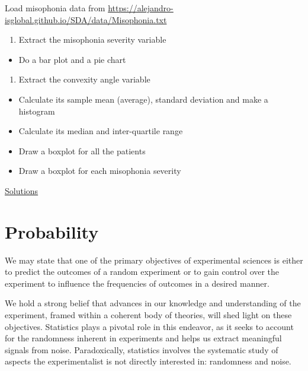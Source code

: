\documentclass[
]{book}
\providecommand{\tightlist}{%
  \setlength{\itemsep}{0pt}\setlength{\parskip}{0pt}}
\begin{document}
Load misophonia data from \url{https://alejandro-isglobal.github.io/SDA/data/Misophonia.txt}

\begin{enumerate}
\def\labelenumi{\arabic{enumi}.}
\tightlist
\item
  Extract the misophonia severity variable
\end{enumerate}

\begin{itemize}
\tightlist
\item
  Do a bar plot and a pie chart
\end{itemize}

\begin{enumerate}
\def\labelenumi{\arabic{enumi}.}
\setcounter{enumi}{1}
\tightlist
\item
  Extract the convexity angle variable
\end{enumerate}

\begin{itemize}
\tightlist
\item
  Calculate its sample mean (average), standard deviation and make a histogram
\item
  Calculate its median and inter-quartile range
\item
  Draw a boxplot for all the patients
\item
  Draw a boxplot for each misophonia severity
\end{itemize}

\href{https://colab.research.google.com/drive/1ncTaoBgskCJcBIb0-PdnbUFr_AKU0XRF?usp=sharing}{Solutions}

\hypertarget{probability}{%
\chapter{Probability}\label{probability}}

We may state that one of the primary objectives of experimental sciences is either to predict the outcomes of a random experiment or to gain control over the experiment to influence the frequencies of outcomes in a desired manner.

We hold a strong belief that advances in our knowledge and understanding of the experiment, framed within a coherent body of theories, will shed light on these objectives. Statistics plays a pivotal role in this endeavor, as it seeks to account for the randomness inherent in experiments and helps us extract meaningful signals from noise. Paradoxically, statistics involves the systematic study of aspects the experimentalist is not directly interested in: randomness and noise.
\end{document}
